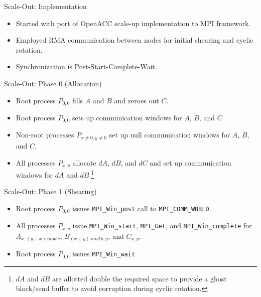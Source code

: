 \documentclass{beamer}
\begin{document}
\begin{frame}{Scale-Out: Implementation}
  \begin{itemize}
  \item{Started with port of OpenACC scale-up implementation to MPI framework.}
  \item{Employed RMA communication between nodes for initial shearing and cyclic rotation.}
  \item{Synchronization is Post-Start-Complete-Wait\autocite[][456-463]{MPIReport31}.}
  \end{itemize}
\end{frame}
\begin{frame}{Scale-Out: Phase 0 (Allocation)}
  \begin{itemize}
    \item{Root process $P_{0,0}$ fills $A$ and $B$ and zeroes out $C$.}
    \item{Root process $P_{0,0}$ sets up communication windows for $A$, $B$, and $C$}
    \item{Non-root processes $P_{x\neq0,y\neq0}$ set up null communication windows for $A$, $B$, and $C$.}
    \item{All processes $P_{x,y}$ allocate $dA$, $dB$, and $dC$ and set up communication windows for $dA$ and $dB$.\footnote{$dA$ and $dB$ are allotted double the required space to provide a ghost block/send buffer to avoid corruption during cyclic rotation.}}
  \end{itemize}
\end{frame}
\begin{frame}{Scale-Out: Phase 1 (Shearing)}
  \begin{itemize}
  \item{Root process $P_{0,0}$ issues \texttt{MPI\_Win\_post} call to \texttt{MPI\_COMM\_WORLD}.}
  \item{All processes $P_{x,y}$ issue \texttt{MPI\_Win\_start}, \texttt{MPI\_Get}, and \texttt{MPI\_Win\_complete} for $A_{x,(y+x)\ mod\ c}$, $B_{(x+y)\ mod\ b, y}$, and $C_{x,y}$.}
  \item{Root process $P_{0,0}$ issues \texttt{MPI\_Win\_wait}.}
  \end{itemize}
\end{frame}
\end{document}
